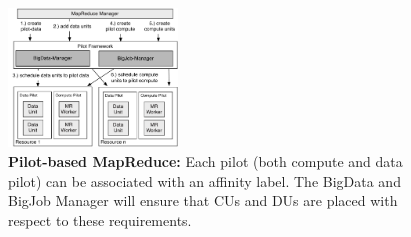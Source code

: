 \documentclass{acm_proc_article-sp}
\begin{document}
\begin{figure}[htbp]
	\centering
	\includegraphics[width=0.4\textwidth]{figures/mapreduce-pilotdata.pdf}
	\caption{\textbf{Pilot-based MapReduce:} Each pilot (both compute and data 
	pilot) can be associated with an affinity label. The BigData and BigJob 
	Manager will ensure that CUs and DUs are placed with respect to these 
	requirements.}
	\label{fig:figures_mapreduce-pilotdata}
\end{figure}
\end{document}
